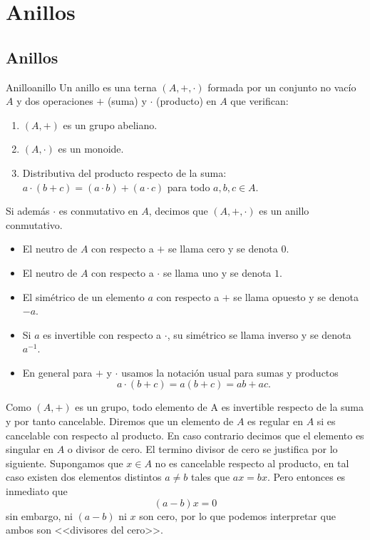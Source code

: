 \chapter{Anillos}

\section{Anillos}

\begin{definition}{Anillo}{anillo}
    Un anillo es una terna \((A, +, \cdot)\) formada por un conjunto no vacío \(A\) y dos operaciones \(+\) (suma) y \(\cdot\) (producto) en \(A\) que verifican:
    \begin{enumerate}
        \item \((A, +)\) es un grupo abeliano.
        \item \((A, \cdot)\) es un monoide.
        \item Distributiva del producto respecto de la suma: \(a \cdot (b + c) = (a \cdot b) + (a \cdot c)\) para todo \(a, b, c \in A\).
    \end{enumerate}
    
    Si además \(\cdot\) es conmutativo en \(A\), decimos que \((A, +, \cdot)\) es un anillo conmutativo.
\end{definition}

\begin{remark}
    \begin{itemize}
        \item El neutro de \(A\) con respecto a \(+\) se llama {cero} y se denota \(0\).
        \item El neutro de \(A\) con respecto a \(\cdot\) se llama {uno} y se denota \(1\).
        \item El simétrico de un elemento \(a\) con respecto a \(+\) se llama {opuesto} y se denota \(-a\).
        \item Si \(a\) es invertible con respecto a \(\cdot\), su simétrico se llama {inverso} y se denota \(a^{-1}\).
        \item En general para $+$ y $\cdot$ usamos la notación usual para sumas y productos
        \[
        a \cdot (b + c) = a(b+c)=ab+ac.
        \] 
    \end{itemize}
\end{remark}

Como $(A, +)$ es un grupo, todo elemento de A es invertible respecto de la suma y por tanto cancelable. Diremos que un elemento de $A$ es regular en $A$ si es cancelable con respecto al producto. En caso contrario decimos que el elemento es singular en $A$ o divisor de cero. El termino divisor de cero se justifica por lo siguiente. Supongamos que $x \in A$ no es cancelable respecto al producto, en tal caso existen dos elementos distintos $a \neq b$ tales que $ax = bx$. Pero entonces es inmediato que
\[
(a-b)x = 0
\]
sin embargo, ni $(a-b)$ ni $x$ son cero, por lo que podemos interpretar que ambos son <<divisores del cero>>.

